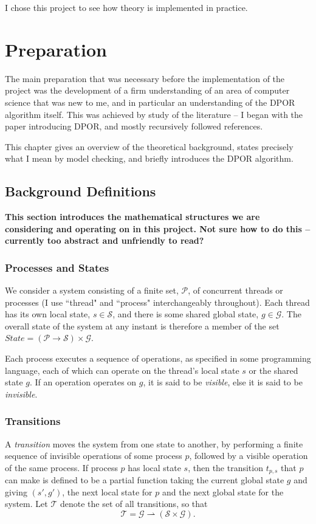 \documentclass[12pt,a4paper,twoside,openright]{report}
\begin{document}
I chose this project to see how theory is
implemented in practice.

\chapter{Preparation}
The main preparation that was necessary before
the implementation of the project was the
development of a firm understanding of an
area of computer science that was new to me,
and in particular an understanding of the
DPOR algorithm itself. This was achieved
by study of the literature -- I began with
the paper introducing DPOR, and mostly
recursively followed references.

This chapter gives an overview of
the theoretical background, states precisely
what I mean by model checking, and briefly
introduces the DPOR algorithm.

\section{Background Definitions} \label{sec:background-defs}
\textbf{This section introduces the mathematical
	structures we are considering and operating on
	in this project.
	Not sure how to do this -- currently too
	abstract and unfriendly to read?}

\subsection{Processes and States}
We consider a system consisting of a finite set, $\mathcal{P}$,
of concurrent threads or processes (I use ``thread" and
``process" interchangeably throughout).
Each thread has its own local state, $s \in \mathcal{S}$, and there
is some shared global state, $g \in \mathcal{G}$. The overall
state of the system at any instant is therefore a member of the set
$ \textit{State} = (\mathcal{P} \to \mathcal{S}) \times \mathcal{G} $.

Each process executes a sequence of operations, as
specified in some programming language, each of which can
operate on the thread's local state $s$ or the shared
state $g$. If an operation
operates on $g$, it is said to be \emph{visible}, else it is said to be
\emph{invisible}.

\subsection{Transitions}
A \emph{transition} moves the system from one state to another,
by performing a finite sequence of invisible operations of some
process $p$, followed by a visible operation of the same process.
If process $p$ has local state $s$, then the transition $t_{p,s}$
that $p$ can make is defined to be a partial function taking the current
global state $g$ and giving $(s', g')$, the next local state for $p$
and the next global state for the system. Let $\mathcal{T}$ denote the
set of all transitions, so that
	\[\mathcal{T} = \mathcal{G} \rightharpoonup
				(\mathcal{S} \times \mathcal{G}).\]
\end{document}
